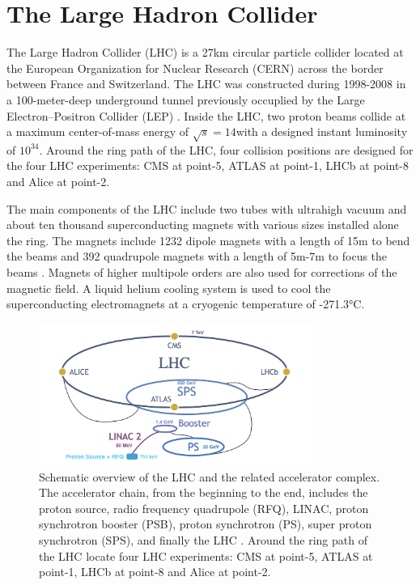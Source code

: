 
\section{The Large Hadron Collider}
\label{sec:cmsExperiment:lhc}

The Large Hadron Collider (LHC) \cite{exhep:lhc:Evans:2008zzb} is a 27km circular particle collider located at the European Organization for Nuclear Research (CERN) across the border between France and Switzerland. The LHC was constructed during 1998-2008 in a 100-meter-deep underground tunnel previously occuplied by the Large Electron–Positron Collider (LEP) \cite{exhep:lep:Myers:1991ym}. Inside the LHC, two proton beams collide at a maximum center-of-mass energy of $\sqrt{s}=14$\TeV with a designed instant luminosity of $10^{34}$\percms. Around the ring path of the LHC, four collision positions are designed for the four LHC experiments: CMS \cite{exhep:cms:Chatrchyan:2008aa} at point-5, ATLAS \cite{exhep:atlas:Aad:2008zzm} at point-1, LHCb \cite{exhep:lhcb:Alves:2008zz} at point-8 and Alice \cite{exhep:alice:Aamodt:2008zz} at point-2.


The main components of the LHC include two tubes with ultrahigh vacuum and about ten thousand superconducting magnets with various sizes installed alone the ring. The magnets include 1232 dipole magnets with a length of 15m to bend the beams and 392 quadrupole magnets with a length of 5m-7m to focus the beams \cite{exhep:lhcFactsFigures}. Magnets of higher multipole orders are also used for corrections of the magnetic field. A liquid helium cooling system is used to cool the superconducting electromagnets at a cryogenic temperature of -271.3\si{\degreeCelsius}. 


\begin{figure}[ht]
    \centering
    \includegraphics[width=0.8\textwidth]{chapters/CMSExperiment/sectionLHC/figures/lhc.png}
    \caption{Schematic overview of the LHC and the related accelerator complex. The accelerator chain, from the beginning to the end, includes the proton source, radio frequency quadrupole (RFQ), LINAC, proton synchrotron booster (PSB), proton synchrotron (PS), super proton synchrotron (SPS), and finally the LHC \cite{exhep:lhcInject:Benedikt:2004wm}. Around the ring path of the LHC locate four LHC experiments: CMS \cite{exhep:cms:Chatrchyan:2008aa} at point-5, ATLAS \cite{exhep:atlas:Aad:2008zzm} at point-1, LHCb \cite{exhep:lhcb:Alves:2008zz} at point-8 and Alice \cite{exhep:alice:Aamodt:2008zz} at point-2.}
    \label{fig:cmsExperiment:lhc:map}
\end{figure}


